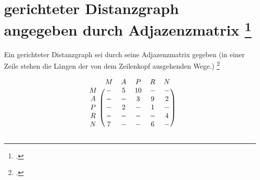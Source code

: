 \documentclass{lehramt-informatik-haupt}
\begin{document}
%

\section{gerichteter Distanzgraph angegeben durch Adjazenzmatrix
\footcite[Seite 3, Aufgabe 5 (Check-Up)]{aud:ab:6}}

Ein gerichteter Distanzgraph sei durch seine Adjazenzmatrix gegeben (in
einer Zeile stehen die Längen der von dem Zeilenkopf ausgehenden Wege.)
\footcite[Seite 3]{aud:ab:6}

\[
\begin{blockarray}{cccccc}
& M & A & P & R & N \\
\begin{block}{c(ccccc)}
  M & - & 5 & 10& - & - \\
  A & - & - & 3 & 9 & 2 \\
  P & - & 2 & - & 1 & - \\
  R & - & - & - & - & 4 \\
  N & 7 & - & - & 6 & - \\
\end{block}
\end{blockarray}
\]
\end{document}
